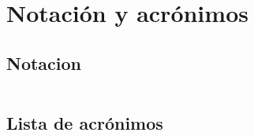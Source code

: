 %
%
\cleardoublepage
{} %


\chapter*{Notación y acrónimos} %

\section*{Notacion}

\begin{tabular}{r r p{0.8\linewidth}}
\end{tabular}

\section*{Lista de acrónimos}

